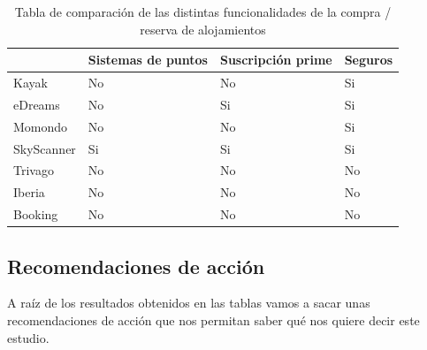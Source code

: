 \begin{table}[H]
    \centering
    \begin{tabular}{l|l|l|l|}
    \cline{2-4}
                                     & Sistemas de puntos & Suscripción prime & Seguros \\ \hline
    \multicolumn{1}{|l|}{Kayak}      & No                 & No                & Si      \\ \hline
    \multicolumn{1}{|l|}{eDreams}    & No                 & Si                & Si      \\ \hline
    \multicolumn{1}{|l|}{Momondo}    & No                 & No                & Si      \\ \hline
    \multicolumn{1}{|l|}{SkyScanner} & Si                 & Si                & Si      \\ \hline
    \multicolumn{1}{|l|}{Trivago}    & No                 & No                & No      \\ \hline
    \multicolumn{1}{|l|}{Iberia}     & No                 & No                & No      \\ \hline
    \multicolumn{1}{|l|}{Booking}    & No                 & No                & No      \\ \hline
    \end{tabular}
    \caption{Tabla de comparación de las distintas funcionalidades de la compra / reserva de alojamientos}
    \label{table:comprar-aloj}
    \end{table}

\subsection{Recomendaciones de acción}

A raíz de los resultados obtenidos en las tablas vamos a sacar unas recomendaciones de acción que nos permitan saber qué nos quiere decir este estudio.

